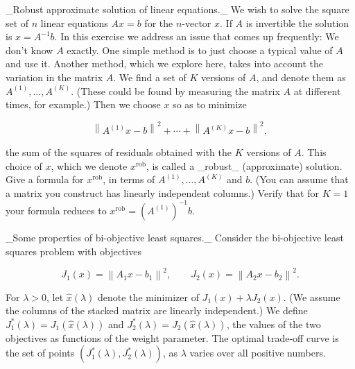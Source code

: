 _Robust approximate solution of linear equations._ We wish to solve the square set of \(n\) linear equations \(Ax=b\) for the \(n\)-vector \(x\). If \(A\) is invertible the solution is \(x=A^{-1}b\). In this exercise we address an issue that comes up frequently: We don't know \(A\) exactly. One simple method is to just choose a typical value of \(A\) and use it. Another method, which we explore here, takes into account the variation in the matrix \(A\). We find a set of \(K\) versions of \(A\), and denote them as \(A^{(1)},\ldots,A^{(K)}\). (These could be found by measuring the matrix \(A\) at different times, for example.) Then we choose \(x\) so as to minimize

\[\left\|A^{(1)}x-b\right\|^{2}+\cdots+\left\|A^{(K)}x-b\right\|^{2},\]

the sum of the squares of residuals obtained with the \(K\) versions of \(A\). This choice of \(x\), which we denote \(x^{\text{rob}}\), is called a _robust_ (approximate) solution. Give a formula for \(x^{\text{rob}}\), in terms of \(A^{(1)},\ldots,A^{(K)}\) and \(b\). (You can assume that a matrix you construct has linearly independent columns.) Verify that for \(K=1\) your formula reduces to \(x^{\text{rob}}=(A^{(1)})^{-1}b\).

_Some properties of bi-objective least squares._ Consider the bi-objective least squares problem with objectives

\[J_{1}(x)=\left\|A_{1}x-b_{1}\right\|^{2},\qquad J_{2}(x)=\left\|A_{2}x-b_{2} \right\|^{2}.\]

For \(\lambda>0\), let \(\hat{x}(\lambda)\) denote the minimizer of \(J_{1}(x)+\lambda J_{2}(x)\). (We assume the columns of the stacked matrix are linearly independent.) We define \(J_{1}^{*}(\lambda)=J_{1}(\hat{x}(\lambda))\) and \(J_{2}^{*}(\lambda)=J_{2}(\hat{x}(\lambda))\), the values of the two objectives as functions of the weight parameter. The optimal trade-off curve is the set of points \((J_{1}^{*}(\lambda),J_{2}^{*}(\lambda))\), as \(\lambda\) varies over all positive numbers.


